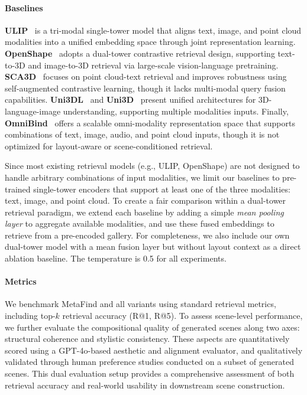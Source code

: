 \paragraph{Baselines} 
\textbf{ULIP}~\cite{xue2024ulip} is a tri-modal single-tower model that aligns text, image, and point cloud modalities into a unified embedding space through joint representation learning. \textbf{OpenShape}~\cite{liu2023openshape} adopts a dual-tower contrastive retrieval design, supporting text-to-3D and image-to-3D retrieval via large-scale vision-language pretraining. \textbf{SCA3D}~\cite{ren2025sca3d} focuses on point cloud-text retrieval and improves robustness using self-augmented contrastive learning, though it lacks multi-modal query fusion capabilities. 
\textbf{Uni3DL}~\cite{li2023uni3dl} and \textbf{Uni3D}~\cite{zhou2023uni3d} present unified architectures for 3D-language-image understanding, supporting multiple modalities inputs. Finally, \textbf{OmniBind}~\cite{wang2024omnibindlargescaleomnimultimodal} offers a scalable omni-modality representation space that supports combinations of text, image, audio, and point cloud inputs, though it is not optimized for layout-aware or scene-conditioned retrieval.

Since most existing retrieval models (e.g., ULIP, OpenShape) are not designed to handle arbitrary combinations of input modalities, we limit our baselines to pre-trained single-tower encoders that support at least one of the three modalities: text, image, and point cloud. To create a fair comparison within a dual-tower retrieval paradigm, we extend each baseline by adding a simple \textit{mean pooling layer} to aggregate available modalities, and use these fused embeddings to retrieve from a pre-encoded gallery. For completeness, we also include our own dual-tower model with a mean fusion layer but without layout context as a direct ablation baseline. The temperature is 0.5 for all experiments.

\paragraph{Metrics} We benchmark MetaFind and all variants using standard retrieval metrics, including top-$k$ retrieval accuracy (R@1, R@5). To assess scene-level performance, we further evaluate the compositional quality of generated scenes along two axes: structural coherence and stylistic consistency. These aspects are quantitatively scored using a GPT-4o-based aesthetic and alignment evaluator, and qualitatively validated through human preference studies conducted on a subset of generated scenes. This dual evaluation setup provides a comprehensive assessment of both retrieval accuracy and real-world usability in downstream scene construction.


